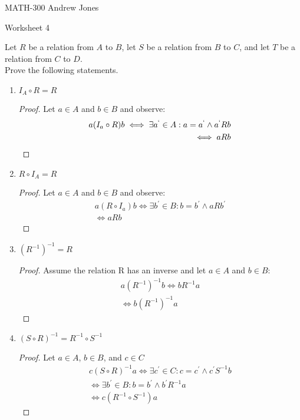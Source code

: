 \documentclass{article}
\begin{document}
    MATH-300 \hfill Andrew Jones
  \begin{center}
  {\huge Worksheet 4}
  \end{center}
  Let $R$ be a relation from $A$ to $B$, let $S$ be a relation from $B$ to $C$, and let $T$ be a relation from $C$ to $D$. \\ Prove the following statements. \\
  \begin{enumerate}
    \item $I_A \circ R = R$
      \begin{proof}
        Let $a\in A$ and $b\in B$ and observe:
        \begin{align*}
          a(I_a \circ R)b \iff \exists a^`\in A: a = a^` \wedge a^`Rb \\
          \iff aRb
        \end{align*}
      \end{proof}
    \item $R \circ I_A = R$
      \begin{proof}
        Let $a\in A$ and $b\in B$ and observe:
        \begin{align*}
          a(R \circ I_a)b \iff \exists b^{'}\in B: b = b^{'} \wedge aRb^{'} \\
          \iff aRb
        \end{align*}
      \end{proof}
    \item $(R^{-1})^{-1} = R$
      \begin{proof}
        Assume the relation R has an inverse and let $a\in A$ and $b\in B$:
        \begin{align*}
          a(R^{-1})^{-1}b \iff bR^{-1}a \\
          \iff b(R^{-1})^{-1}a
        \end{align*}
      \end{proof}
    \item $(S \circ R)^{-1} = R^{-1}\circ S^{-1}$
      \begin{proof}
        Let $a\in A$, $b\in B$, and $c\in C$
        \begin{align*}
          c(S \circ R)^{-1}a \iff \exists c^{'}\in C: c = c^{'} \wedge c^{'}S^{-1}b \\
          \iff \exists b^{'}\in B: b=b^{'} \wedge b^{'}R^{-1}a \\
          \iff c(R^{-1} \circ S^{-1})a
        \end{align*}
      \end{proof}

\end{enumerate}
\end{document}
